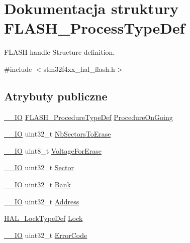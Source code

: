 \hypertarget{struct_f_l_a_s_h___process_type_def}{}\section{Dokumentacja struktury F\+L\+A\+S\+H\+\_\+\+Process\+Type\+Def}
\label{struct_f_l_a_s_h___process_type_def}


F\+L\+A\+SH handle Structure definition.  




{\ttfamily \#include $<$stm32f4xx\+\_\+hal\+\_\+flash.\+h$>$}

\subsection*{Atrybuty publiczne}
\begin{DoxyCompactItemize}
\item 
\hyperlink{core__sc300_8h_aec43007d9998a0a0e01faede4133d6be}{\+\_\+\+\_\+\+IO} \hyperlink{group___f_l_a_s_h___exported___types_ga2b0268387bc11bcab76be9ce7c43eaaf}{F\+L\+A\+S\+H\+\_\+\+Procedure\+Type\+Def} \hyperlink{struct_f_l_a_s_h___process_type_def_adcc5fdaba7d53dffdab0510a4dd7d179}{Procedure\+On\+Going}
\item 
\hyperlink{core__sc300_8h_aec43007d9998a0a0e01faede4133d6be}{\+\_\+\+\_\+\+IO} uint32\+\_\+t \hyperlink{struct_f_l_a_s_h___process_type_def_a2b72d9ea23673332beeb57da48ededeb}{Nb\+Sectors\+To\+Erase}
\item 
\hyperlink{core__sc300_8h_aec43007d9998a0a0e01faede4133d6be}{\+\_\+\+\_\+\+IO} uint8\+\_\+t \hyperlink{struct_f_l_a_s_h___process_type_def_aac2fd0eb2907b7317b0f620fb5303c21}{Voltage\+For\+Erase}
\item 
\hyperlink{core__sc300_8h_aec43007d9998a0a0e01faede4133d6be}{\+\_\+\+\_\+\+IO} uint32\+\_\+t \hyperlink{struct_f_l_a_s_h___process_type_def_a0c9115ac01c2fefd3c6ad112e7133b29}{Sector}
\item 
\hyperlink{core__sc300_8h_aec43007d9998a0a0e01faede4133d6be}{\+\_\+\+\_\+\+IO} uint32\+\_\+t \hyperlink{struct_f_l_a_s_h___process_type_def_af784f610d9892ece59daf9da80a8d3e4}{Bank}
\item 
\hyperlink{core__sc300_8h_aec43007d9998a0a0e01faede4133d6be}{\+\_\+\+\_\+\+IO} uint32\+\_\+t \hyperlink{struct_f_l_a_s_h___process_type_def_a680a9b907eb67c762b16ef7051cd8942}{Address}
\item 
\hyperlink{stm32f4xx__hal__def_8h_ab367482e943333a1299294eadaad284b}{H\+A\+L\+\_\+\+Lock\+Type\+Def} \hyperlink{struct_f_l_a_s_h___process_type_def_ab5892cd1aacb0c0304b40f57023061e2}{Lock}
\item 
\hyperlink{core__sc300_8h_aec43007d9998a0a0e01faede4133d6be}{\+\_\+\+\_\+\+IO} uint32\+\_\+t \hyperlink{struct_f_l_a_s_h___process_type_def_a8a6cc581b8b180090429d0a3c0ca0172}{Error\+Code}
\end{DoxyCompactItemize}


